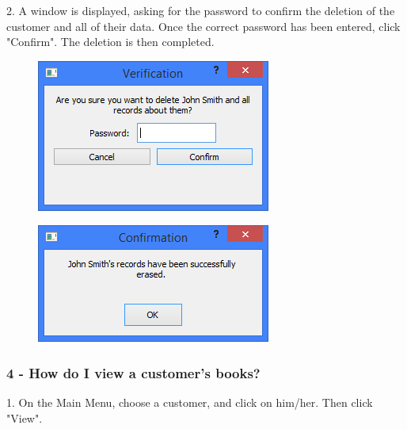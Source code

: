 2. A window is displayed, asking for the password to confirm the deletion of the customer and all of their data. Once the correct password has been entered, click "Confirm". The deletion is then completed.

\begin{figure}[H]
    \includegraphics[width=\textwidth]{./Manual/Tutorial/Q3/Verification.png}
\end{figure}

\begin{figure}[H]
    \includegraphics[width=\textwidth]{./Manual/Tutorial/Q3/Erased.png}
\end{figure}

\subsubsection{4 -  How do I view a customer's books?} \label{sssec:Q4}

1. On the Main Menu, choose a customer, and click on him/her. Then click "View".

